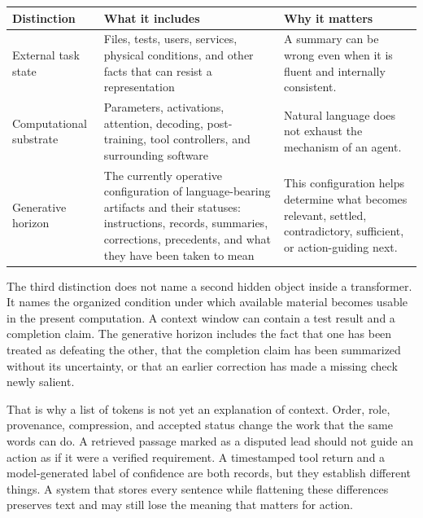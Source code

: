 \documentclass[12pt]{article}
\newcounter{none}
\begin{document}
{\def\LTcaptype{none} %
\begin{longtable}[]{@{}
  >{\raggedright\arraybackslash}p{}
  >{\raggedright\arraybackslash}p{}
  >{\raggedright\arraybackslash}p{}@{}}
\toprule\noalign{}
\begin{minipage}[b]{\linewidth}\raggedright
Distinction
\end{minipage} & \begin{minipage}[b]{\linewidth}\raggedright
What it includes
\end{minipage} & \begin{minipage}[b]{\linewidth}\raggedright
Why it matters
\end{minipage} \\
\midrule\noalign{}
\endhead
\bottomrule\noalign{}
\endlastfoot
External task state & Files, tests, users, services, physical conditions, and other facts that can resist a representation & A summary can be wrong even when it is fluent and internally consistent. \\
Computational substrate & Parameters, activations, attention, decoding, post-training, tool controllers, and surrounding software & Natural language does not exhaust the mechanism of an agent. \\
Generative horizon & The currently operative configuration of language-bearing artifacts and their statuses: instructions, records, summaries, corrections, precedents, and what they have been taken to mean & This configuration helps determine what becomes relevant, settled, contradictory, sufficient, or action-guiding next. \\
\end{longtable}
\normalsize
}

The third distinction does not name a second hidden object inside a transformer. It names the organized condition under which available material becomes usable in the present computation. A context window can contain a test result and a completion claim. The generative horizon includes the fact that one has been treated as defeating the other, that the completion claim has been summarized without its uncertainty, or that an earlier correction has made a missing check newly salient.

That is why a list of tokens is not yet an explanation of context. Order, role, provenance, compression, and accepted status change the work that the same words can do. A retrieved passage marked as a disputed lead should not guide an action as if it were a verified requirement. A timestamped tool return and a model-generated label of confidence are both records, but they establish different things. A system that stores every sentence while flattening these differences preserves text and may still lose the meaning that matters for action.
\end{document}
